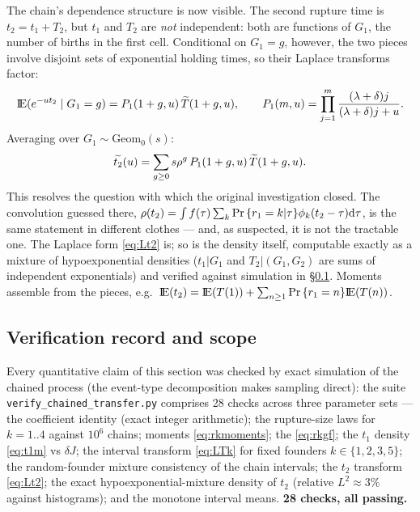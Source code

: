 The chain's dependence structure is now visible. The second rupture time is
$t_2=t_1+T_2$, but $t_1$ and $T_2$ are \emph{not} independent: both are
functions of $G_1$, the number of births in the first cell. Conditional on
$G_1=g$, however, the two pieces involve disjoint sets of exponential
holding times, so their Laplace transforms factor:
\begin{equation}
{\rm I}\!{\rm E}(e^{-ut_2}\mid G_1=g)
=P_1(1+g,u)\,\widetilde{T}(1+g,u),
\qquad
P_1(m,u)=\prod_{j=1}^{m}\frac{(\lambda+\delta)j}{(\lambda+\delta)j+u}.
\end{equation}
Averaging over $G_1\sim\mathrm{Geom}_0(s)$:
\begin{equation}
\widetilde{t_2}(u)
=\sum_{g\ge0} s\rho^g\,P_1(1+g,u)\,\widetilde{T}(1+g,u).
\label{eq:Lt2}
\end{equation}
This resolves the question with which the original investigation closed. The
convolution guessed there,
$\rho(t_2)=\int f(\tau)\sum_k{\text{Pr}\left\{r_1=k|\tau\right\}}\phi_k(t_2-\tau){\rm d}\tau$,
is the same statement in different clothes --- and, as suspected, it is not
the tractable one. The Laplace form \eqref{eq:Lt2} is; so is the density
itself, computable exactly as a mixture of hypoexponential densities
($t_1|G_1$ and $T_2|(G_1,G_2)$ are sums of independent exponentials) and
verified against simulation in \S\ref{sec:chained-verification}. Moments
assemble from the pieces, e.g.\
${\rm I}\!{\rm E}(t_2)={\rm I}\!{\rm E}(T(1))+\sum_{n\ge1}{\text{Pr}\left\{r_1=n\right\}}{\rm I}\!{\rm E}(T(n))$.

\subsection{Verification record and scope}
\label{sec:chained-verification}

Every quantitative claim of this section was checked by exact simulation of
the chained process (the event-type decomposition makes sampling direct):
the suite \texttt{verify\_chained\_transfer.py} comprises 28 checks across
three parameter sets --- the coefficient identity (exact integer
arithmetic); the rupture-size laws for $k=1..4$ against $10^6$ chains;
moments \eqref{eq:rkmoments}; the \pgf{} \eqref{eq:rkgf}; the $t_1$ density
\eqref{eq:t1m} vs $\delta J$; the interval transform \eqref{eq:LTk} for
fixed founders $k\in\{1,2,3,5\}$; the random-founder mixture consistency of
the chain intervals; the $t_2$ transform \eqref{eq:Lt2}; the exact
hypoexponential-mixture density of $t_2$ (relative $L^2\approx3\%$ against
histograms); and the monotone interval means. \textbf{28 checks, all
passing.}

